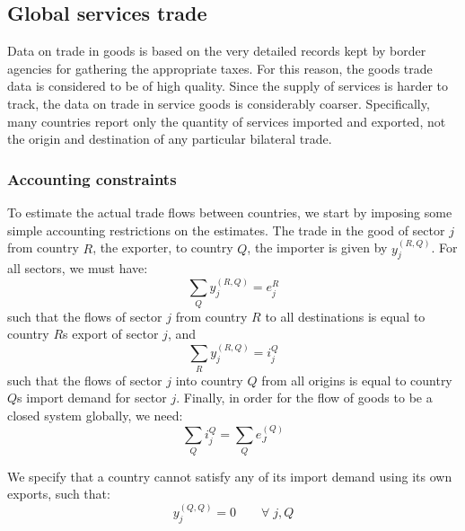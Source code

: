 \documentclass[preprint,authoryear,3p]{elsarticle}
\begin{document}
\pagebreak





\subsection{Global services trade} \label{servicestrade}
Data on trade in goods is based on the very detailed records kept by border agencies for gathering the appropriate taxes. For this reason, the goods trade data is considered to be of high quality. Since the supply of services is harder to track, the data on trade in service goods is considerably coarser. Specifically, many countries report only the quantity of services imported and exported, not the origin and destination of any particular bilateral trade.





\subsubsection{Accounting constraints} \label{accountingconstraints}
To estimate the actual trade flows between countries, we start by imposing some simple accounting restrictions on the estimates. The trade in the good of sector $j$ from country $R$, the exporter, to country $Q$, the importer is given by $y_j^{(R,Q)}$. For all sectors, we must have:
\begin{equation}
\sum\limits_{Q} y_j^{(R,Q)} = e_j^{R}
\end{equation}
such that the flows of sector $j$ from country $R$ to all destinations is equal to country $R$s export of sector $j$, and
\begin{equation}
\sum\limits_{R} y_j^{(R,Q)} = i_j^{Q}
\end{equation}
such that the flows of sector $j$ into country $Q$ from all origins is equal to country $Q$s import demand for sector $j$. Finally, in order for the flow of goods to be a closed system globally, we need:
\begin{equation} \label{eqn:ImportsMustMatchExports}
\sum\limits_{Q} i_j^{Q} = \sum\limits_{Q} e_J^{(Q)}
\end{equation}

We specify that a country cannot satisfy any of its import demand using its own exports, such that:
\begin{equation} \label{noselfimports}
y_j^{(Q,Q)} = 0 \qquad \forall \; j,Q
\end{equation}
\end{document}
